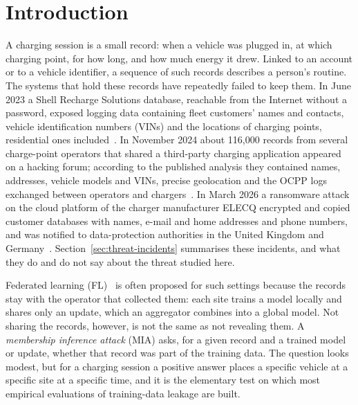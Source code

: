 
\section{Introduction}
\label{sec:introduction}

A charging session is a small record: when a vehicle was plugged in, at which
charging point, for how long, and how much energy it drew. Linked to an
account or to a vehicle identifier, a sequence of such records describes a
person's routine. The systems that hold these records have repeatedly failed
to keep them. In June 2023 a Shell Recharge Solutions database, reachable
from the Internet without a password, exposed logging data containing fleet
customers' names and contacts, vehicle identification numbers (VINs) and the
locations of charging points, residential ones
included~\cite{whittaker2023shell}. In November 2024 about 116{,}000 records
from several charge-point operators that shared a third-party charging
application appeared on a hacking forum; according to the published analysis
they contained names, addresses, vehicle models and VINs, precise
geolocation and the OCPP logs exchanged between operators and
chargers~\cite{robb2024cpo}. In March 2026 a ransomware attack on the cloud
platform of the charger manufacturer ELECQ encrypted and copied customer
databases with names, e-mail and home addresses and phone numbers, and was
notified to data-protection authorities in the United Kingdom and
Germany~\cite{page2026elecq}. Section~\ref{sec:threat-incidents} summarises
these incidents, and what they do and do not say about the threat studied
here.

Federated learning (FL)~\cite{mcmahan2017communication} is often proposed
for such settings because the records stay with the operator that collected
them: each site trains a model locally and shares only an update, which an
aggregator combines into a global model. Not sharing the records, however, is
not the same as not revealing them. A \emph{membership inference attack}
(MIA) asks, for a given record and a trained model or update, whether that
record was part of the training data. The question looks modest, but for a
charging session a positive answer places a specific vehicle at a specific
site at a specific time, and it is the elementary test on which most
empirical evaluations of training-data leakage are built.

